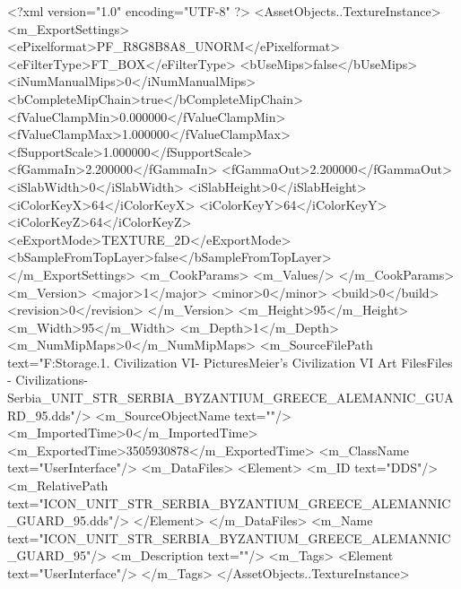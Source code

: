 <?xml version="1.0" encoding="UTF-8" ?>
<AssetObjects..TextureInstance>
	<m_ExportSettings>
		<ePixelformat>PF_R8G8B8A8_UNORM</ePixelformat>
		<eFilterType>FT_BOX</eFilterType>
		<bUseMips>false</bUseMips>
		<iNumManualMips>0</iNumManualMips>
		<bCompleteMipChain>true</bCompleteMipChain>
		<fValueClampMin>0.000000</fValueClampMin>
		<fValueClampMax>1.000000</fValueClampMax>
		<fSupportScale>1.000000</fSupportScale>
		<fGammaIn>2.200000</fGammaIn>
		<fGammaOut>2.200000</fGammaOut>
		<iSlabWidth>0</iSlabWidth>
		<iSlabHeight>0</iSlabHeight>
		<iColorKeyX>64</iColorKeyX>
		<iColorKeyY>64</iColorKeyY>
		<iColorKeyZ>64</iColorKeyZ>
		<eExportMode>TEXTURE_2D</eExportMode>
		<bSampleFromTopLayer>false</bSampleFromTopLayer>
	</m_ExportSettings>
	<m_CookParams>
		<m_Values/>
	</m_CookParams>
	<m_Version>
		<major>1</major>
		<minor>0</minor>
		<build>0</build>
		<revision>0</revision>
	</m_Version>
	<m_Height>95</m_Height>
	<m_Width>95</m_Width>
	<m_Depth>1</m_Depth>
	<m_NumMipMaps>0</m_NumMipMaps>
	<m_SourceFilePath text="F:\Mod Storage\2.1. Civilization VI\Mods\Archive - Pictures\Sid Meier's Civilization VI Art Files\Art Files - Civilizations\Civilization - Serbia\ICON_UNIT_STR_SERBIA_BYZANTIUM_GREECE_ALEMANNIC_GUARD_95.dds"/>
	<m_SourceObjectName text=""/>
	<m_ImportedTime>0</m_ImportedTime>
	<m_ExportedTime>3505930878</m_ExportedTime>
	<m_ClassName text="UserInterface"/>
	<m_DataFiles>
		<Element>
			<m_ID text="DDS"/>
			<m_RelativePath text="ICON_UNIT_STR_SERBIA_BYZANTIUM_GREECE_ALEMANNIC_GUARD_95.dds"/>
		</Element>
	</m_DataFiles>
	<m_Name text="ICON_UNIT_STR_SERBIA_BYZANTIUM_GREECE_ALEMANNIC_GUARD_95"/>
	<m_Description text=""/>
	<m_Tags>
		<Element text="UserInterface"/>
	</m_Tags>
</AssetObjects..TextureInstance>

